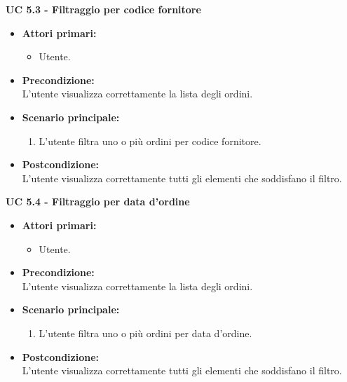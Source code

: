 \vspace{0.5cm}

\noindent \textbf{\large UC 5.3 - Filtraggio per codice fornitore}
\label{uc:filtraggio-codice-fornitore}
\begin{itemize}

	\item \textbf{Attori primari: }
		\begin{itemize}
			\item Utente.
		\end{itemize}

	\item \textbf{Precondizione: }\\[0.3cm]
		L'utente visualizza correttamente la lista degli ordini.

	\item \textbf{Scenario principale: }
		\begin{enumerate}
			\item L'utente filtra uno o più ordini per codice fornitore.
		\end{enumerate}
		

	\item \textbf{Postcondizione: }\\[0.3cm]
		L'utente visualizza correttamente tutti gli elementi che soddisfano il filtro.

\end{itemize}

\vspace{0.5cm}

\noindent \textbf{\large UC 5.4 - Filtraggio per data d'ordine}
\label{uc:filtraggio-data-ordine}
\begin{itemize}

	\item \textbf{Attori primari: }
		\begin{itemize}
			\item Utente.
		\end{itemize}

	\item \textbf{Precondizione: }\\[0.3cm]
		L'utente visualizza correttamente la lista degli ordini.

	\item \textbf{Scenario principale: }
		\begin{enumerate}
			\item L'utente filtra uno o più ordini per data d'ordine.
		\end{enumerate}
		

	\item \textbf{Postcondizione: }\\[0.3cm]
		L'utente visualizza correttamente tutti gli elementi che soddisfano il filtro.

\end{itemize}

